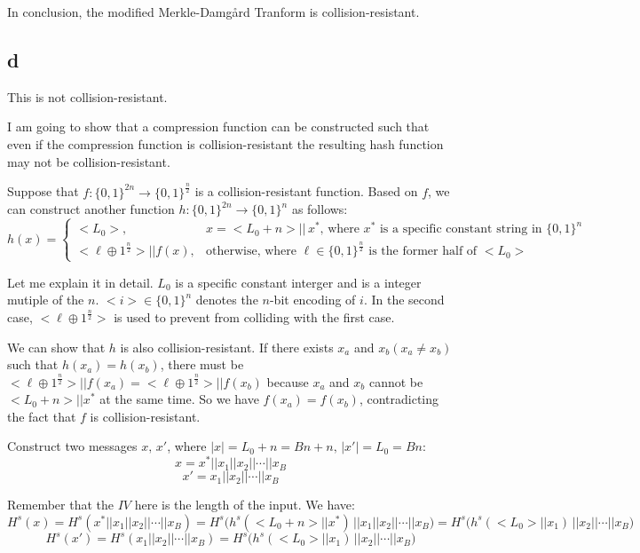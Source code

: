 \documentclass[a4papers]{ctexart}
\begin{document}
 In conclusion, the modified Merkle-Damgård Tranform is collision-resistant.


\subsection*{d}
This is not collision-resistant.

I am going to show that a compression function can be constructed such that even if 
the compression function is collision-resistant the resulting hash function may not be collision-resistant.

Suppose that $f:\{0,1\}^{2n}\rightarrow\{0,1\}^{\frac{n}{2}}$ is a collision-resistant function.
 Based on $f$, we can construct another function $h:\{0,1\}^{2n}\rightarrow\{0,1\}^{n}$ as follows:
 \begin{equation*}
h(x)=
 \begin{cases}
     <L_0>, & x = <L_0+n> ||\, x^*,\,\mbox{where }x^*\mbox{ is a specific constant string in }\{0,1\}^{n} \\
     < \ell \oplus 1^{\frac{n}{2}}>||f(x), & \mbox{otherwise, where } \ell \in \{0,1\}^{\frac{n}{2}} \mbox{ is the former half of }<L_0>
 \end{cases}
\end{equation*}

Let me explain it in detail. $L_0$ is a specific constant interger and is a integer mutiple of the $n$. $<i>\in \{0,1\}^{n}$ denotes the 
$n$-bit encoding of $i$. In the second case, $ < \ell \oplus 1^{\frac{n}{2}}>$ is used to prevent from colliding with the first case.

We can show that $h$ is also collision-resistant. If there exists $x_a$ and $x_b(x_a\ne x_b)$ such that $h(x_a)=h(x_b)$, 
there must be $< \ell \oplus 1^{\frac{n}{2}}>||f(x_a) = < \ell \oplus 1^{\frac{n}{2}}>||f(x_b)$ because $x_a$ and $x_b$ cannot be $<L_0+n> || x^*$ at the same time.
So we have $f(x_a)=f(x_b)$, contradicting the fact that $f$ is collision-resistant.

Construct two messages $x,\, x'$, where $|x|=L_0+n=Bn+n,\,|x'|=L_0=Bn$:
\[x=x^*||x_1||x_2||\cdots||x_{B}\]
\[x'=x_1||x_2||\cdots||x_{B}\]

Remember that the $IV$ here is the length of the input. We have:
\[H^s(x) = H^s(x^*||x_1||x_2||\cdots||x_{B}) =  H^s\Big(h^s(<L_0+n>||x^*)\, ||x_1|| x_2||\cdots||x_{B}\Big) =  H^s\Big(h^s(<L_0>||x_1)\,||x_2||\cdots||x_{B}\Big) \]
\[H^s(x') = H^s(x_1||x_2||\cdots||x_{B}) = H^s\Big(h^s(<L_0>||x_1)\,||x_2||\cdots||x_{B}\Big)\]
\end{document}
